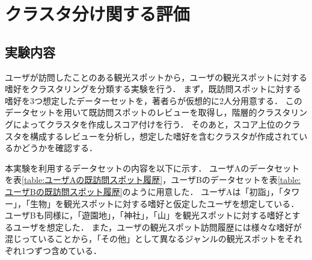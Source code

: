 \documentclass{deimj}
\begin{document}
\section{クラスタ分け関する評価}
\subsection{実験内容}
ユーザが訪問したことのある観光スポットから，ユーザの観光スポットに対する嗜好をクラスタリングを分類する実験を行う．
まず，既訪問スポットに対する嗜好を3つ想定したデーターセットを，著者らが仮想的に2人分用意する．
このデータセットを用いて既訪問スポットのレビューを取得し，階層的クラスタリングによってクラスタを作成しスコア付けを行う．
そのあと，スコア上位のクラスタを構成するレビューを分析し，想定した嗜好を含むクラスタが作成されているかどうかを確認する．


本実験を利用するデータセットの内容を以下に示す．
ユーザAのデータセットを表\ref{table:ユーザAの既訪問スポット履歴}，ユーザBのデータセットを表\ref{table:ユーザBの既訪問スポット履歴}のように用意した．
ユーザAは「初詣」，「タワー」，「生物」を観光スポットに対する嗜好と仮定したユーザを想定している．
ユーザBも同様に，「遊園地」，「神社」，「山」を観光スポットに対する嗜好とするユーザを想定した．
また，ユーザの観光スポット訪問履歴には様々な嗜好が混じっていることから，「その他」として異なるジャンルの観光スポットをそれぞれ1つずつ含めている．
\end{document}
